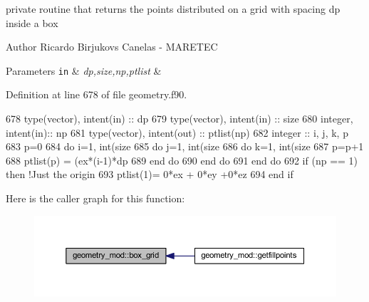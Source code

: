 private routine that returns the points distributed on a grid with spacing dp inside a box 

\begin{DoxyAuthor}{Author}
Ricardo Birjukovs Canelas -\/ M\+A\+R\+E\+T\+EC 
\end{DoxyAuthor}

\begin{DoxyParams}[1]{Parameters}
\mbox{\tt in}  & {\em dp,size,np,ptlist} & \\
\hline
\end{DoxyParams}


Definition at line 678 of file geometry.\+f90.


\begin{DoxyCode}
678     \textcolor{keywordtype}{type}(vector), \textcolor{keywordtype}{intent(in)} :: dp
679     \textcolor{keywordtype}{type}(vector), \textcolor{keywordtype}{intent(in)} :: size
680     \textcolor{keywordtype}{integer}, \textcolor{keywordtype}{intent(in)}::  np
681     \textcolor{keywordtype}{type}(vector), \textcolor{keywordtype}{intent(out)} :: ptlist(np)
682     \textcolor{keywordtype}{integer} :: i, j, k, p
683     p=0
684     \textcolor{keywordflow}{do} i=1, int(size%
685         \textcolor{keywordflow}{do} j=1, int(size%
686             \textcolor{keywordflow}{do} k=1, int(size%
687                 p=p+1
688                 ptlist(p) = (ex*(i-1)*dp%
689 \textcolor{keywordflow}{            end do}
690 \textcolor{keywordflow}{        end do}
691 \textcolor{keywordflow}{    end do}
692     \textcolor{keywordflow}{if} (np == 1) \textcolor{keywordflow}{then} \textcolor{comment}{!Just the origin}
693         ptlist(1)= 0*ex + 0*ey +0*ez
694 \textcolor{keywordflow}{    end if}
\end{DoxyCode}
Here is the caller graph for this function\+:\nopagebreak
\begin{figure}[H]
\begin{center}
\leavevmode
\includegraphics[width=350pt]{namespacegeometry__mod_ae87e4ecff2d21a839da2b82919b5fd0b_icgraph}
\end{center}
\end{figure}
\mbox{\label{namespacegeometry__mod_ad790edd694561b33dad20cfa3a14e8f2}} 
